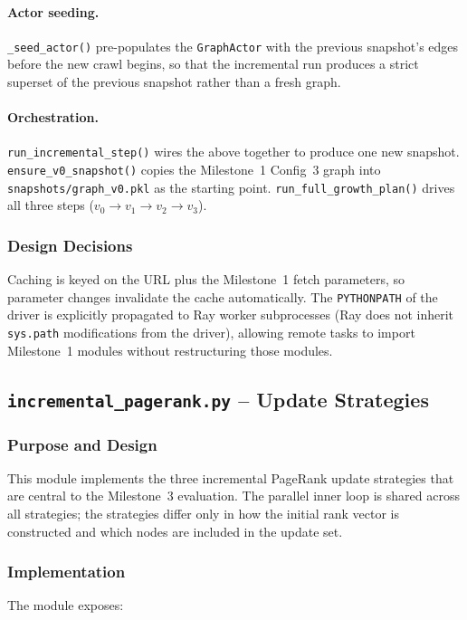 \documentclass[11pt,a4paper]{article}
\begin{document}
\paragraph{Actor seeding.} \texttt{\_seed\_actor()} pre-populates the
\texttt{GraphActor} with the previous snapshot's edges before the new
crawl begins, so that the incremental run produces a strict superset of
the previous snapshot rather than a fresh graph.

\paragraph{Orchestration.} \texttt{run\_incremental\_step()} wires the
above together to produce one new snapshot. \texttt{ensure\_v0\_snapshot()}
copies the Milestone~1 Config~3 graph into
\texttt{snapshots/graph\_v0.pkl} as the starting point.
\texttt{run\_full\_growth\_plan()} drives all three steps
($v_0 \to v_1 \to v_2 \to v_3$).

\subsubsection{Design Decisions}
Caching is keyed on the URL plus the Milestone~1 fetch parameters, so
parameter changes invalidate the cache automatically. The
\texttt{PYTHONPATH} of the driver is explicitly propagated to Ray
worker subprocesses (Ray does not inherit \texttt{sys.path}
modifications from the driver), allowing remote tasks to import
Milestone~1 modules without restructuring those modules.

\subsection{\texttt{incremental\_pagerank.py} -- Update Strategies}

\subsubsection{Purpose and Design}
This module implements the three incremental PageRank update strategies
that are central to the Milestone~3 evaluation. The parallel inner loop
is shared across all strategies; the strategies differ only in how the
initial rank vector is constructed and which nodes are included in the
update set.

\subsubsection{Implementation}
The module exposes:
\end{document}
